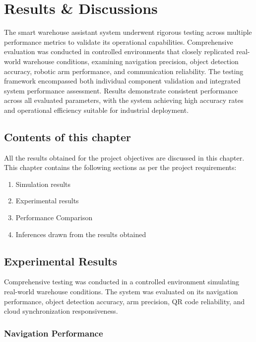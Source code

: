 \chapter{Results \& Discussions}

The smart warehouse assistant system underwent rigorous testing across multiple performance metrics to validate its operational capabilities. Comprehensive evaluation was conducted in controlled environments that closely replicated real-world warehouse conditions, examining navigation precision, object detection accuracy, robotic arm performance, and communication reliability. The testing framework encompassed both individual component validation and integrated system performance assessment. Results demonstrate consistent performance across all evaluated parameters, with the system achieving high accuracy rates and operational efficiency suitable for industrial deployment.

\section{Contents of this chapter}

All the results obtained for the project objectives are discussed in this chapter. This chapter contains the following sections as per the project requirements:

\begin{enumerate}
    \item Simulation results
    \item Experimental results
    \item Performance Comparison
    \item Inferences drawn from the results obtained
\end{enumerate}

\section{Experimental Results}

Comprehensive testing was conducted in a controlled environment simulating real-world warehouse conditions. The system was evaluated on its navigation performance, object detection accuracy, arm precision, QR code reliability, and cloud synchronization responsiveness.

\subsection{Navigation Performance}

